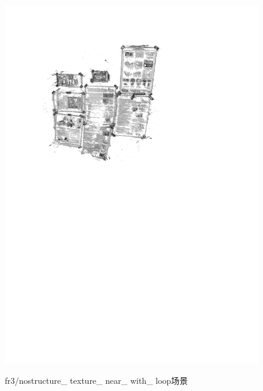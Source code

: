 \begin{figure}[h]
{          \includegraphics[scale=0.6]{figures/Fig4-5_b.pdf}
          }
     \caption{fr3/nostructure\_ texture\_ near\_ with\_ loop场景}
\label{fig4.5}
\end{figure}



